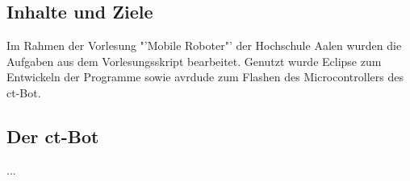 \subsection{Inhalte und Ziele}
Im Rahmen der Vorlesung "'Mobile Roboter"' der Hochschule Aalen wurden die Aufgaben aus dem Vorlesungsskript bearbeitet.
Genutzt wurde Eclipse zum Entwickeln der Programme sowie avrdude zum Flashen des Microcontrollers des ct-Bot.

\subsection{Der ct-Bot}
...
